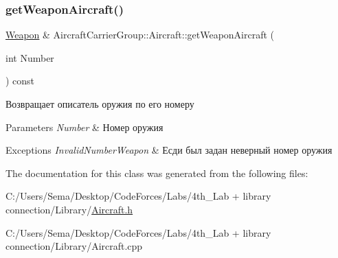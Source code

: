 \subsubsection{\texorpdfstring{get\+Weapon\+Aircraft()}{getWeaponAircraft()}}
{\footnotesize\ttfamily \mbox{\hyperlink{class_aircraft_carrier_group_1_1_weapon}{Weapon}} \& Aircraft\+Carrier\+Group\+::\+Aircraft\+::get\+Weapon\+Aircraft (\begin{DoxyParamCaption}\item[{int}]{Number }\end{DoxyParamCaption}) const}



Возвращает описатель оружия по его номеру 


\begin{DoxyParams}{Parameters}
{\em Number} & Номер оружия \\
\hline
\end{DoxyParams}

\begin{DoxyExceptions}{Exceptions}
{\em Invalid\+Number\+Weapon} & Есди был задан неверный номер оружия \\
\hline
\end{DoxyExceptions}


The documentation for this class was generated from the following files\+:\begin{DoxyCompactItemize}
\item 
C\+:/\+Users/\+Sema/\+Desktop/\+Code\+Forces/\+Labs/4th\+\_\+\+Lab + library connection/\+Library/\mbox{\hyperlink{_aircraft_8h}{Aircraft.\+h}}\item 
C\+:/\+Users/\+Sema/\+Desktop/\+Code\+Forces/\+Labs/4th\+\_\+\+Lab + library connection/\+Library/Aircraft.\+cpp\end{DoxyCompactItemize}
